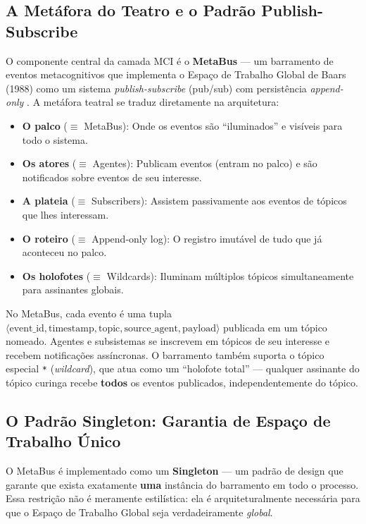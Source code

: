 \subsection{A Metáfora do Teatro e o Padrão Publish-Subscribe}

O componente central da camada MCI é o \textbf{MetaBus} — um barramento de eventos metacognitivos que implementa o Espaço de Trabalho Global de Baars (1988) como um sistema \textit{publish-subscribe} (pub/sub) com persistência \textit{append-only} \cite{Baars1988_GWT, Baars1997_Theater}. A metáfora teatral se traduz diretamente na arquitetura:

\begin{itemize}
    \item \textbf{O palco} ($\equiv$ MetaBus): Onde os eventos são ``iluminados'' e visíveis para todo o sistema.
    \item \textbf{Os atores} ($\equiv$ Agentes): Publicam eventos (entram no palco) e são notificados sobre eventos de seu interesse.
    \item \textbf{A plateia} ($\equiv$ Subscribers): Assistem passivamente aos eventos de tópicos que lhes interessam.
    \item \textbf{O roteiro} ($\equiv$ Append-only log): O registro imutável de tudo que já aconteceu no palco.
    \item \textbf{Os holofotes} ($\equiv$ Wildcards): Iluminam múltiplos tópicos simultaneamente para assinantes globais.
\end{itemize}

No MetaBus, cada evento é uma tupla $\langle \text{event\_id}, \text{timestamp}, \text{topic}, \text{source\_agent}, \text{payload} \rangle$ publicada em um tópico nomeado. Agentes e subsistemas se inscrevem em tópicos de seu interesse e recebem notificações assíncronas. O barramento também suporta o tópico especial \texttt{*} (\textit{wildcard}), que atua como um ``holofote total'' — qualquer assinante do tópico curinga recebe \textbf{todos} os eventos publicados, independentemente do tópico.

\subsection{O Padrão Singleton: Garantia de Espaço de Trabalho Único}

O MetaBus é implementado como um \textbf{Singleton} — um padrão de design que garante que exista exatamente \textbf{uma} instância do barramento em todo o processo. Essa restrição não é meramente estilística: ela é arquiteturalmente necessária para que o Espaço de Trabalho Global seja verdadeiramente \textit{global}.

